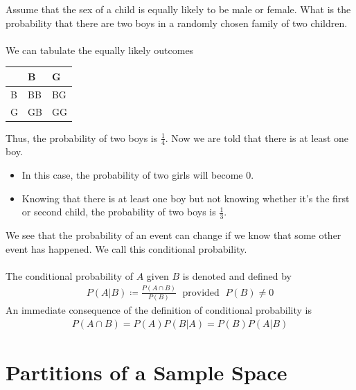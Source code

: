 \documentclass{report}
\begin{document}
\begin{enumerate}
		Assume that the sex of a child is equally likely to be male or female. What is the probability that there are two boys in a randomly chosen family of two children.
		\\ \\
		We can tabulate the equally likely outcomes
		\begin{table}[H]
			\centering
			\begin{tabular}[c]{p{2cm}|p{2cm}p{2cm}}
				& B & G	\\
				\hline
				B & BB & BG	\\
				G & GB & GG
			\end{tabular}
		\end{table}
		Thus, the probability of two boys is $\frac{1}{4}$.
		Now we are told that there is at least one boy.
		\begin{itemize}
			\item In this case, the probability of two girls will become 0.
			\item Knowing that there is at least one boy but not knowing whether it's the first or second child, the probability of two boys is $\frac{1}{3}$.
		\end{itemize}
		We see that the probability of an event can change if we know that some other event has happened. We call this conditional probability.
		\\ \\
		The conditional probability of $A$ given $B$ is denoted and defined by
		\begin{align*}
			P(A|B) \coloneq \frac{P(A \cap B)}{P(B)} \; \text{ provided } \; P(B) \neq 0
		\end{align*}
		An immediate consequence of the definition of conditional probability is
		\begin{align*}
			P(A \cap B) = P(A)P(B|A) = P(B)P(A|B)
		\end{align*}
	
	\section{Partitions of a Sample Space}


\end{enumerate}
\end{document}
